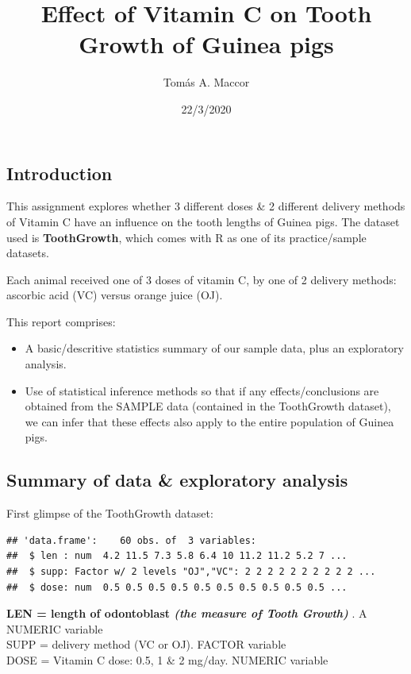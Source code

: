 \documentclass[]{article}
\title{Effect of Vitamin C on Tooth Growth of Guinea pigs}
\author{Tomás A. Maccor}
\date{22/3/2020}
\providecommand{\tightlist}{%
  \setlength{\itemsep}{0pt}\setlength{\parskip}{0pt}}
\begin{document}
\maketitle

\hypertarget{introduction}{%
\subsection{Introduction}\label{introduction}}

This assignment explores whether 3 different doses \& 2 different
delivery methods of Vitamin C have an influence on the tooth lengths of
Guinea pigs. The dataset used is \textbf{ToothGrowth}, which comes with
R as one of its practice/sample datasets.

Each animal received one of 3 doses of vitamin C, by one of 2 delivery
methods: ascorbic acid (VC) versus orange juice (OJ).

This report comprises:

\begin{itemize}
\tightlist
\item
  A basic/descritive statistics summary of our sample data, plus an
  exploratory analysis.
\item
  Use of statistical inference methods so that if any
  effects/conclusions are obtained from the SAMPLE data (contained in
  the ToothGrowth dataset), we can infer that these effects also apply
  to the entire population of Guinea pigs.
\end{itemize}

\hypertarget{summary-of-data-exploratory-analysis}{%
\subsection{Summary of data \& exploratory
analysis}\label{summary-of-data-exploratory-analysis}}

First glimpse of the ToothGrowth dataset:

\begin{verbatim}
## 'data.frame':    60 obs. of  3 variables:
##  $ len : num  4.2 11.5 7.3 5.8 6.4 10 11.2 11.2 5.2 7 ...
##  $ supp: Factor w/ 2 levels "OJ","VC": 2 2 2 2 2 2 2 2 2 2 ...
##  $ dose: num  0.5 0.5 0.5 0.5 0.5 0.5 0.5 0.5 0.5 0.5 ...
\end{verbatim}

\textbf{LEN = length of odontoblast \emph{(the measure of Tooth Growth)}
}. A NUMERIC variable\\
SUPP = delivery method (VC or OJ). FACTOR variable\\
DOSE = Vitamin C dose: 0.5, 1 \& 2 mg/day. NUMERIC variable
\end{document}
